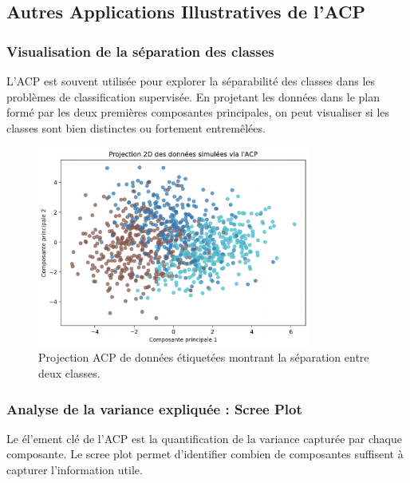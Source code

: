 \documentclass[a4paper,12pt]{report}
\begin{document}
\subsection{Autres Applications Illustratives de l’ACP}

\subsubsection{Visualisation de la s\'eparation des classes}
L'ACP est souvent utilis\'ee pour explorer la s\'eparabilit\'e des classes dans les probl\`emes de classification supervis\'ee. En projetant les donn\'ees dans le plan form\'e par les deux premi\`eres composantes principales, on peut visualiser si les classes sont bien distinctes ou fortement entrem\^el\'ees.

\begin{figure}
  \centering
  \includegraphics[width=0.8\textwidth]{separation_classes.png} %
  \caption{Projection ACP de donn\'ees \'etiquet\'ees montrant la s\'eparation entre deux classes.}
  \label{fig:separation_classes}
\end{figure}

\subsubsection{Analyse de la variance expliqu\'ee : Scree Plot}
Le \'el'ement cl\'e de l'ACP est la quantification de la variance captur\'ee par chaque composante. Le scree plot permet d'identifier combien de composantes suffisent \`a capturer l'information utile.
\end{document}
